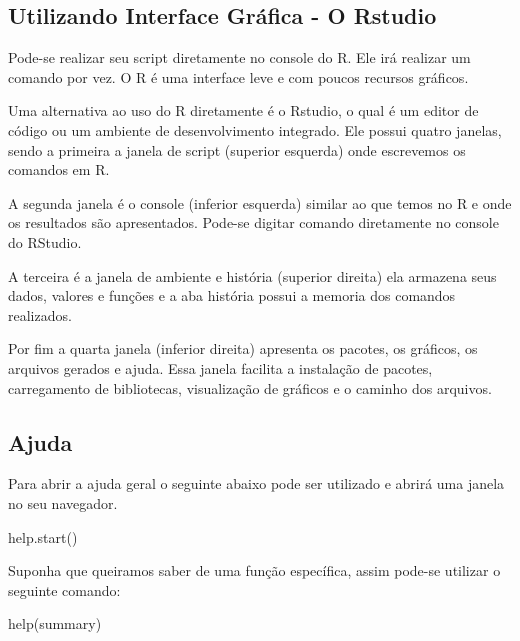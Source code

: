 \documentclass[
  letterpaper,
  DIV=11,
  numbers=noendperiod]{scrreprt}
\newenvironment{Shaded}{\begin{snugshade}}{\end{snugshade}}
\newcommand{\FunctionTok}[1]{\textcolor[rgb]{0.28,0.35,0.67}{#1}}
\newcommand{\NormalTok}[1]{\textcolor[rgb]{0.00,0.23,0.31}{#1}}
\begin{document}
\subsection{Utilizando Interface Gráfica - O
Rstudio}\label{utilizando-interface-gruxe1fica---o-rstudio}

Pode-se realizar seu script diretamente no console do R. Ele irá
realizar um comando por vez. O R é uma interface leve e com poucos
recursos gráficos.

Uma alternativa ao uso do R diretamente é o Rstudio, o qual é um editor
de código ou um ambiente de desenvolvimento integrado. Ele possui quatro
janelas, sendo a primeira a janela de script (superior esquerda) onde
escrevemos os comandos em R.

A segunda janela é o console (inferior esquerda) similar ao que temos no
R e onde os resultados são apresentados. Pode-se digitar comando
diretamente no console do RStudio.

A terceira é a janela de ambiente e história (superior direita) ela
armazena seus dados, valores e funções e a aba história possui a memoria
dos comandos realizados.

Por fim a quarta janela (inferior direita) apresenta os pacotes, os
gráficos, os arquivos gerados e ajuda. Essa janela facilita a instalação
de pacotes, carregamento de bibliotecas, visualização de gráficos e o
caminho dos arquivos.

\subsection{Ajuda}\label{ajuda}

Para abrir a ajuda geral o seguinte abaixo pode ser utilizado e abrirá
uma janela no seu navegador.

\begin{Shaded}
\begin{Highlighting}[]
\FunctionTok{help.start}\NormalTok{()}
\end{Highlighting}
\end{Shaded}

Suponha que queiramos saber de uma função específica, assim pode-se
utilizar o seguinte comando:

\begin{Shaded}
\begin{Highlighting}[]
\FunctionTok{help}\NormalTok{(summary)}
\end{Highlighting}
\end{Shaded}
\end{document}
